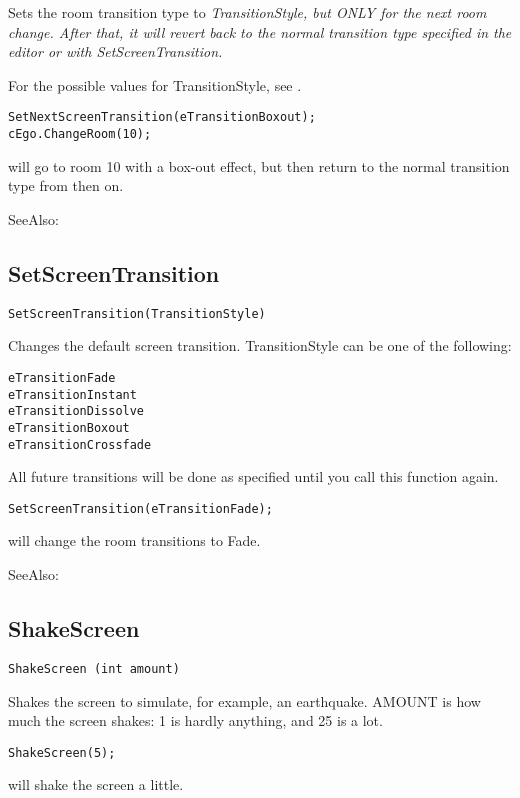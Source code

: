 Sets the room transition type to \it{TransitionStyle}, but ONLY for the next room change. After
that, it will revert back to the normal transition type specified in the editor or with
SetScreenTransition.

For the possible values for TransitionStyle, see .

\begin{verbatim}
SetNextScreenTransition(eTransitionBoxout);
cEgo.ChangeRoom(10);
\end{verbatim}
will go to room 10 with a box-out effect, but then return to the normal transition
type from then on.

SeeAlso: 


\subsection{SetScreenTransition}\label{SetScreenTransition}%

\begin{verbatim}
SetScreenTransition(TransitionStyle)
\end{verbatim}
Changes the default screen transition. TransitionStyle can be one of the following:
\begin{verbatim}
eTransitionFade
eTransitionInstant
eTransitionDissolve
eTransitionBoxout
eTransitionCrossfade
\end{verbatim}
All future transitions will be done as specified until you call this
function again.

\begin{verbatim}
SetScreenTransition(eTransitionFade);
\end{verbatim}
will change the room transitions to Fade.

SeeAlso: 


\subsection{ShakeScreen}\label{ShakeScreen}%

\begin{verbatim}
ShakeScreen (int amount)
\end{verbatim}
Shakes the screen to simulate, for example, an earthquake. AMOUNT is
how much the screen shakes: 1 is hardly anything, and 25 is a lot.

\begin{verbatim}
ShakeScreen(5);
\end{verbatim}
will shake the screen a little.

